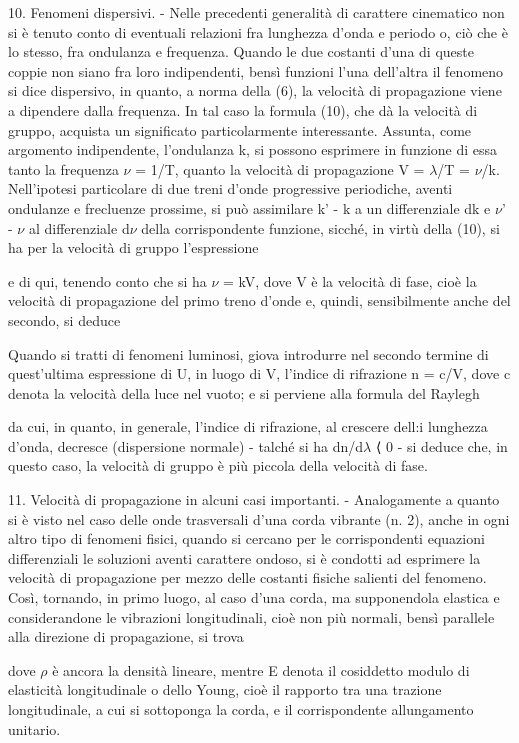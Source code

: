 \documentclass[a4paper]{article}
\begin{document}
10. Fenomeni dispersivi. - Nelle precedenti generalità di carattere cinematico non si è tenuto conto di eventuali relazioni fra lunghezza d'onda e periodo o, ciò che è lo stesso, fra ondulanza e frequenza. Quando le due costanti d'una di queste coppie non siano fra loro indipendenti, bensì funzioni l'una dell'altra il fenomeno si dice dispersivo, in quanto, a norma della (6), la velocità di propagazione viene a dipendere dalla frequenza. In tal caso la formula (10), che dà la velocità di gruppo, acquista un significato particolarmente interessante. Assunta, come argomento indipendente, l'ondulanza k, si possono esprimere in funzione di essa tanto la frequenza $\nu$ = 1/T, quanto la velocità di propagazione V = $\lambda$/T = $\nu$/k. Nell'ipotesi particolare di due treni d'onde progressive periodiche, aventi ondulanze e frecluenze prossime, si può assimilare k' - k a un differenziale dk e $\nu$' - $\nu$ al differenziale d$\nu$ della corrispondente funzione, sicché, in virtù della (10), si ha per la velocità di gruppo l'espressione

e di qui, tenendo conto che si ha $\nu$ = kV, dove V è la velocità di fase, cioè la velocità di propagazione del primo treno d'onde e, quindi, sensibilmente anche del secondo, si deduce

Quando si tratti di fenomeni luminosi, giova introdurre nel secondo termine di quest'ultima espressione di U, in luogo di V, l'indice di rifrazione n = c/V, dove c denota la velocità della luce nel vuoto; e si perviene alla formula del Raylegh

da cui, in quanto, in generale, l'indice di rifrazione, al crescere dell:i lunghezza d'onda, decresce (dispersione normale) - talché si ha dn/d$\lambda$ ⟨ 0 - si deduce che, in questo caso, la velocità di gruppo è più piccola della velocità di fase.

11. Velocità di propagazione in alcuni casi importanti. - Analogamente a quanto si è visto nel caso delle onde trasversali d'una corda vibrante (n. 2), anche in ogni altro tipo di fenomeni fisici, quando si cercano per le corrispondenti equazioni differenziali le soluzioni aventi carattere ondoso, si è condotti ad esprimere la velocità di propagazione per mezzo delle costanti fisiche salienti del fenomeno. Così, tornando, in primo luogo, al caso d'una corda, ma supponendola elastica e considerandone le vibrazioni longitudinali, cioè non più normali, bensì parallele alla direzione di propagazione, si trova

dove $\rho$ è ancora la densità lineare, mentre E denota il cosiddetto modulo di elasticità longitudinale o dello Young, cioè il rapporto tra una trazione longitudinale, a cui si sottoponga la corda, e il corrispondente allungamento unitario.
\end{document}
